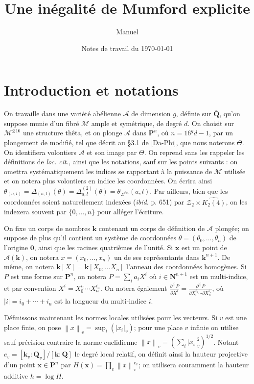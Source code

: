 \documentclass[11pt, twoside, a4paper, french]{article}
\author{Manuel \bsc{Pégourié-Gonnard}}
\title{Une inégalité de Mumford explicite}
\date{Notes de travail du \today}
\numberwithin{equation}{section}
\newcommand{\lat}[1]{\emph{#1}} \newcommand{\pmm}[1]{\ \text{#1}}
\newcommand{\std}[1]{\mathbf{#1}} \newcommand{\N}{\std{N}} \newcommand{\Z}{\std{Z}}
\newcommand{\Q}{\std{Q}} \newcommand{\R}{\std{R}} \newcommand{\C}{\std{C}}
\newcommand{\Proj}{\std{P}} \newcommand{\Qbar}{\overline{\Q}} \newcommand{\cdn}{\boldsymbol{k}}
\newcommand{\av}[2][v]{\left\lvert#2\right\rvert_{#1}} 		%
\newcommand{\nv}[2][v]{\left\lVert#2\right\rVert_{#1}} 		%
\newcommand{\A}{\mathcal{A}} 					%
\newcommand{\p}[1]{{\boldsymbol{#1}}} 				%
\newcommand{\OA}{\p{0}} 					%
\newcommand{\coa}{\theta} 					%
\begin{document}
\maketitle

\section*{Introduction et notations}

On travaille dans une variété abélienne $\A$ de dimension $g$, définie sur $\Qbar$, qu'on suppose munie d'un fibré $\mathcal{M}$ ample et symétrique, de degré $d$. On choisit sur $\mathcal{M}^{\otimes 16}$ une structure thêta, et on plonge $\A$ dans $\Proj^n$, où $n=16^g d - 1$, par un plongement de  modifié, tel que décrit au §3.1 de [Da-Phi], que nous noterons $\Theta$. On identifiera volontiers $\A$ et son image par $\Theta$. On reprend sans les rappeler les définitions de \lat{loc. cit.}, ainsi que les notations, sauf sur les points suivants : on omettra systématiquement les indices se rapportant à la puissance de $\mathcal{M}$ utilisée et on notera plus volontiers en indice les coordonnées. On écrira ainsi $\coa_{(a, l)} = \Delta_{(a, l)}(\coa)  = \Delta_{a, l}^{(2)}(\coa) = \coa_{\mathcal{L}^{\otimes 4}}(a, l)$. Par ailleurs, bien que les coordonnées soient naturellement indexées (\lat{ibid.} p. 651) par $\mathcal{Z}_2 \times \widehat{K_2(4)}$, on les indexera souvent par $\{0, \dots, n\}$ pour alléger l'écriture.

On fixe un corps de nombres $\cdn$ contenant un corps de définition de $\A$ plongée; on suppose de plus qu'il contient un système de coordonnées $\coa = (\coa_0,\dots,\coa_n)$ de l'origine $\OA$, ainsi que les racines quatrièmes de l'unité. Si $\p{x}$ est un point de $\A(\cdn)$, on notera $x = (x_0, \dots, x_n)$ un de ses représentants dans $\cdn^{n+1}$. De même, on notera $\cdn[X] = \cdn[X_0, \dots X_n]$ l'anneau des coordonnées homogènes. Si $P$ est une forme sur $\Proj^n$, on notera $P= \sum_i a_i X^i$ où $i \in \N^{n+1}$ est un multi-indice, et par convention $X^i = X_0^{i_0}\cdots X_n^{i_n}$. On notera également $\frac{\partial^{|i|} P}{\partial X^i} = \frac{\partial^{|i|} P}{\partial X_0^{i_0}\cdots \partial X_n^{i_n}}$, où $|i| = i_0 + \cdots + i_n$ est la longueur du multi-indice $i$.

Définissons maintenant les normes locales utilisées pour les vecteurs. Si $v$ est une place finie, on pose $\nv{x} = \sup_i(\av{x_i})$; pour une place $v$ infinie on utilise sauf précision contraire la norme euclidienne $\nv{x} = ( \sum_i \av{x_i}^2 )^{1/2}$. Notant $e_v = [\cdn_v : \Q_v]/[\cdn : \Q]$ le degré local relatif, on définit ainsi la hauteur projective d'un point $\p{x} \in \Proj^n$ par $H(\p{x}) = \prod_v \nv{x}^{e_v}$; on utilisera couramment la hauteur additive $h = \log H$.
\end{document}
